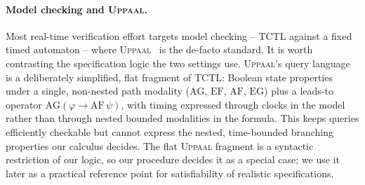 \paragraph{Model checking and \textsc{Uppaal}.}
Most real-time verification effort targets {model checking} -- TCTL against a fixed timed
automaton -- where \textsc{Uppaal}~\cite{BehrmannLarsenYi2004Uppaal} is the de-facto standard. It is
worth contrasting the {specification logic} the two settings use. \textsc{Uppaal}'s query
language is a deliberately {simplified}, flat fragment of TCTL: Boolean state properties under a
single, non-nested path modality ($\mathrm{AG}$, $\mathrm{EF}$, $\mathrm{AF}$, $\mathrm{EG}$) plus a
leads-to operator $\mathrm{AG}(\varphi\rightarrow\mathrm{AF}\,\psi)$,
with timing expressed through clocks in the {model} rather than through nested bounded
modalities in the formula. This keeps queries efficiently checkable but cannot express the nested,
time-bounded branching properties our calculus decides. The flat \textsc{Uppaal} fragment is a
syntactic restriction of our logic, so our procedure decides it as a special case; we use it later as
a practical reference point for satisfiability of realistic specifications.
